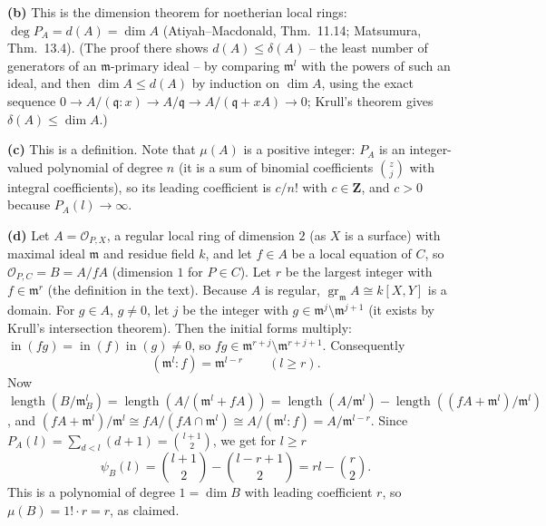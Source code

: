 \documentclass[11pt]{article}
\begin{document}
\textbf{(b)} This is the dimension theorem for noetherian local rings: $\deg P_A=d(A)=\dim A$ (Atiyah--Macdonald, Thm.~11.14; Matsumura, Thm.~13.4). (The proof there shows $d(A)\le\delta(A)$ -- the least number of generators of an $\mathfrak m$-primary ideal -- by comparing $\mathfrak m^l$ with the powers of such an ideal, and then $\dim A\le d(A)$ by induction on $\dim A$, using the exact sequence $0\to A/(\mathfrak q:x)\to A/\mathfrak q\to A/(\mathfrak q+xA)\to0$; Krull's theorem gives $\delta(A)\le\dim A$.)

\textbf{(c)} This is a definition. Note that $\mu(A)$ is a positive integer: $P_A$ is an integer-valued polynomial of degree $n$ (it is a sum of binomial coefficients $\binom{z}{j}$ with integral coefficients), so its leading coefficient is $c/n!$ with $c\in\mathbf Z$, and $c>0$ because $P_A(l)\to\infty$.

\textbf{(d)} Let $A=\mathcal O_{P,X}$, a regular local ring of dimension $2$ (as $X$ is a surface) with maximal ideal $\mathfrak m$ and residue field $k$, and let $f\in A$ be a local equation of $C$, so $\mathcal O_{P,C}=B=A/fA$ (dimension $1$ for $P\in C$). Let $r$ be the largest integer with $f\in\mathfrak m^r$ (the definition in the text). Because $A$ is regular, $\operatorname{gr}_{\mathfrak m}A\cong k[X,Y]$ is a domain. For $g\in A$, $g\neq0$, let $j$ be the integer with $g\in\mathfrak m^j\setminus\mathfrak m^{j+1}$ (it exists by Krull's intersection theorem). Then the initial forms multiply: $\operatorname{in}(fg)=\operatorname{in}(f)\operatorname{in}(g)\ne0$, so $fg\in\mathfrak m^{r+j}\setminus\mathfrak m^{r+j+1}$. Consequently
\[
(\mathfrak m^l:f)=\mathfrak m^{l-r}\qquad(l\ge r).
\]
Now $\operatorname{length}(B/\mathfrak m_B^l)=\operatorname{length}(A/(\mathfrak m^l+fA))=\operatorname{length}(A/\mathfrak m^l)-\operatorname{length}((fA+\mathfrak m^l)/\mathfrak m^l)$, and $(fA+\mathfrak m^l)/\mathfrak m^l\cong fA/(fA\cap\mathfrak m^l)\cong A/(\mathfrak m^l:f)=A/\mathfrak m^{l-r}$. Since $P_A(l)=\sum_{d<l}(d+1)=\binom{l+1}{2}$, we get for $l\ge r$
\[
\psi_B(l)=\binom{l+1}2-\binom{l-r+1}2=rl-\binom r2 .
\]
This is a polynomial of degree $1=\dim B$ with leading coefficient $r$, so $\mu(B)=1!\cdot r=r$, as claimed.
\end{document}
